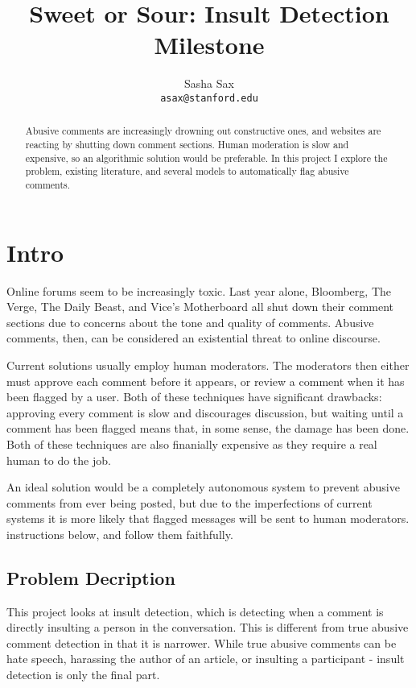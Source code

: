 \documentclass{article} %
\title{Sweet or Sour: Insult Detection Milestone}
\author{
	Sasha Sax \\
	\texttt{asax@stanford.edu}
}
\begin{document}
\maketitle

\begin{abstract}
Abusive comments are increasingly drowning out constructive ones, and websites are reacting by shutting down comment sections. Human moderation is slow and expensive, so an algorithmic solution would be preferable. In this project I explore the problem, existing literature, and several models to automatically flag abusive comments.
\end{abstract}

\section{Intro}
Online forums seem to be increasingly toxic. Last year alone, Bloomberg, The Verge, The Daily Beast, and Vice’s Motherboard all shut down their comment sections due to concerns about the tone and quality of comments. Abusive comments, then, can be considered an existential threat to online discourse.

Current solutions usually employ human moderators. The moderators then either must approve each comment before it appears, or review a comment when it has been flagged by a user. Both of these techniques have significant drawbacks: approving every comment is slow and discourages discussion, but waiting until a comment has been flagged means that, in some sense, the damage has been done. Both of these techniques are also finanially expensive as they require a real human to do the job. 

An ideal solution would be a completely autonomous system to prevent abusive comments from ever being posted, but due to the imperfections of current systems it is more likely that flagged messages will be sent to human moderators.
instructions below, and follow them faithfully.

\subsection{Problem Decription}
This project looks at insult detection, which is detecting when a comment is directly insulting a person in the conversation. This is different from true abusive comment detection in that it is narrower. While true abusive comments can be hate speech, harassing the author of an article, or insulting a participant - insult detection is only the final part. 
\end{document}
